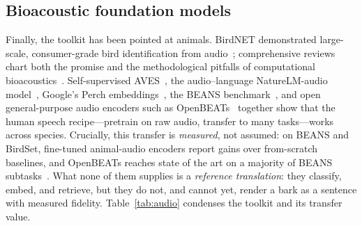 \subsection{Bioacoustic foundation models}
Finally, the toolkit has been pointed at animals. BirdNET demonstrated
large-scale, consumer-grade bird identification from
audio~\cite{kahl2021birdnet}; comprehensive reviews chart both the promise and
the methodological pitfalls of computational
bioacoustics~\cite{stowell2022review,stowell2014automatic}. Self-supervised
AVES~\cite{hagiwara2023aves}, the audio--language NatureLM-audio
model~\cite{robinson2024naturelm}, Google's Perch embeddings~\cite{ghani2023perch},
the BEANS benchmark~\cite{hagiwara2023beans}, and open general-purpose audio
encoders such as OpenBEATs~\cite{openbeats2025} together show that the
human speech recipe---pretrain on raw audio, transfer to many tasks---works
across species. Crucially, this transfer is \emph{measured}, not assumed: on
BEANS and BirdSet, fine-tuned animal-audio encoders report gains over
from-scratch baselines, and OpenBEATs reaches state of the art on a majority
of BEANS subtasks~\cite{hagiwara2023beans,openbeats2025}. What none of them
supplies is a \emph{reference translation}:
they classify, embed, and retrieve, but they do not, and cannot yet, render a
bark as a sentence with measured fidelity. Table~\ref{tab:audio} condenses the
toolkit and its transfer value.

